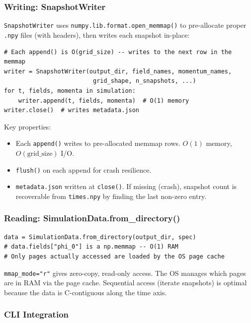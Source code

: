 \subsubsection{Writing: SnapshotWriter}

\texttt{SnapshotWriter} uses \texttt{numpy.lib.format.open\_memmap()} to pre-allocate proper \texttt{.npy} files (with headers), then writes each snapshot in-place:

\begin{lstlisting}[style=python]
# Each append() is O(grid_size) -- writes to the next row in the memmap
writer = SnapshotWriter(output_dir, field_names, momentum_names,
                         grid_shape, n_snapshots, ...)
for t, fields, momenta in simulation:
    writer.append(t, fields, momenta)  # O(1) memory
writer.close()  # writes metadata.json
\end{lstlisting}

Key properties:

\begin{itemize}
  \item Each \texttt{append()} writes to pre-allocated memmap rows. $O(1)$ memory, $O(\text{grid\_size})$ I/O.
  \item \texttt{flush()} on each append for crash resilience.
  \item \texttt{metadata.json} written at \texttt{close()}. If missing (crash), snapshot count is recoverable from \texttt{times.npy} by finding the last non-zero entry.
\end{itemize}

\subsubsection{Reading: SimulationData.from\_directory()}

\begin{lstlisting}[style=python]
data = SimulationData.from_directory(output_dir, spec)
# data.fields["phi_0"] is a np.memmap -- O(1) RAM
# Only pages actually accessed are loaded by the OS page cache
\end{lstlisting}

\texttt{mmap\_mode="r"} gives zero-copy, read-only access. The OS manages which pages are in RAM via the page cache. Sequential access (iterate snapshots) is optimal because the data is C-contiguous along the time axis.

\subsubsection{CLI Integration}

